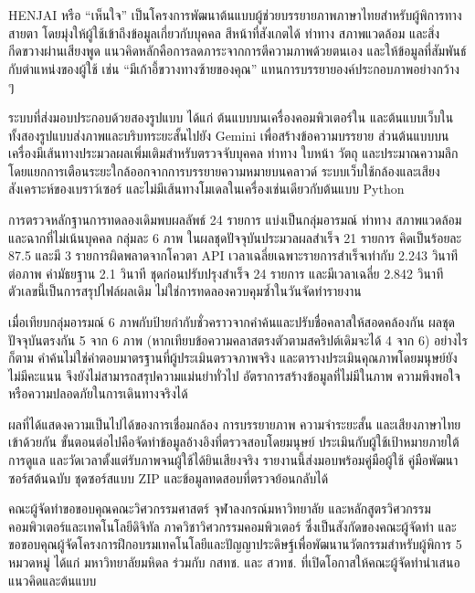 

HENJAI หรือ ``เห็นใจ'' เป็นโครงการพัฒนาต้นแบบผู้ช่วยบรรยายภาพภาษาไทยสำหรับผู้พิการทางสายตา โดยมุ่งให้ผู้ใช้เข้าถึงข้อมูลเกี่ยวกับบุคคล สีหน้าที่สังเกตได้ ท่าทาง สภาพแวดล้อม และสิ่งกีดขวางผ่านเสียงพูด แนวคิดหลักคือการลดภาระจากการตีความภาพด้วยตนเอง และให้ข้อมูลที่สัมพันธ์กับตำแหน่งของผู้ใช้ เช่น ``มีเก้าอี้ขวางทางซ้ายของคุณ'' แทนการบรรยายองค์ประกอบภาพอย่างกว้าง ๆ

ระบบที่ส่งมอบประกอบด้วยสองรูปแบบ ได้แก่ ต้นแบบบนเครื่องคอมพิวเตอร์ใน  และต้นแบบเว็บใน  ทั้งสองรูปแบบส่งภาพและบริบทระยะสั้นไปยัง Gemini เพื่อสร้างข้อความบรรยาย ส่วนต้นแบบบนเครื่องมีเส้นทางประมวลผลเพิ่มเติมสำหรับตรวจจับบุคคล ท่าทาง ใบหน้า วัตถุ และประมาณความลึก โดยแยกการเตือนระยะใกล้ออกจากการบรรยายความหมายบน\mbox{คลาวด์} ระบบเว็บใช้กล้องและเสียงสังเคราะห์ของเบราว์เซอร์ และไม่มีเส้นทางโมเดลในเครื่องเช่นเดียวกับต้นแบบ Python

การตรวจหลักฐานการทดลองเดิมพบผลลัพธ์ 24 รายการ แบ่งเป็นกลุ่มอารมณ์ ท่าทาง สภาพแวดล้อม และฉากที่ไม่เน้นบุคคล กลุ่มละ 6 ภาพ ในผลชุดปัจจุบันประมวลผลสำเร็จ 21 รายการ คิดเป็นร้อยละ 87.5 และมี 3 รายการผิดพลาดจากโควตา API เวลาเฉลี่ยเฉพาะรายการสำเร็จเท่ากับ 2.243 วินาทีต่อภาพ ค่ามัธยฐาน 2.1 วินาที ชุดก่อนปรับปรุงสำเร็จ 24 รายการ และมีเวลาเฉลี่ย 2.842 วินาที ตัวเลขนี้เป็นการสรุปไฟล์ผลเดิม ไม่ใช่การทดลองควบคุมซ้ำในวันจัดทำรายงาน

เมื่อเทียบกลุ่มอารมณ์ 6 ภาพกับป้ายกำกับชั่วคราวจากคำค้นและปรับชื่อคลาสให้สอดคล้องกัน ผลชุดปัจจุบันตรงกัน 5 จาก 6 ภาพ (หากเทียบข้อความคลาสตรงตัวตามสคริปต์เดิมจะได้ 4 จาก 6) อย่างไรก็ตาม คำค้นไม่ใช่คำตอบมาตรฐานที่ผู้ประเมินตรวจภาพจริง และตารางประเมินคุณภาพโดยมนุษย์ยังไม่มีคะแนน จึงยังไม่สามารถสรุปความแม่นยำทั่วไป อัตราการสร้างข้อมูลที่ไม่มีในภาพ ความพึงพอใจ หรือความปลอดภัยในการเดินทางจริงได้

ผลที่ได้แสดงความเป็นไปได้ของการเชื่อมกล้อง การบรรยายภาพ ความจำระยะสั้น และเสียงภาษาไทยเข้าด้วยกัน ขั้นตอนต่อไปคือจัดทำข้อมูลอ้างอิงที่ตรวจสอบโดยมนุษย์ ประเมินกับผู้ใช้เป้าหมายภายใต้การดูแล และวัดเวลาตั้งแต่รับภาพจนผู้ใช้ได้ยินเสียงจริง รายงานนี้ส่งมอบพร้อมคู่มือผู้ใช้ คู่มือพัฒนา ซอร์สต้นฉบับ ชุดซอร์สแบบ ZIP และข้อมูลทดสอบที่ตรวจย้อนกลับได้

คณะผู้จัดทำขอขอบคุณคณะวิศวกรรมศาสตร์ จุฬาลงกรณ์มหาวิทยาลัย และหลักสูตรวิศวกรรมคอมพิวเตอร์และเทคโนโลยีดิจิทัล ภาควิชาวิศวกรรมคอมพิวเตอร์ ซึ่งเป็นสังกัดของคณะผู้จัดทำ และขอขอบคุณผู้จัดโครงการฝึกอบรมเทคโนโลยีและปัญญาประดิษฐ์เพื่อพัฒนานวัตกรรมสำหรับผู้พิการ 5 หมวดหมู่ ได้แก่ มหาวิทยาลัยมหิดล ร่วมกับ กสทช. และ สวทช. ที่เปิดโอกาสให้คณะผู้จัดทำนำเสนอแนวคิดและต้นแบบ

